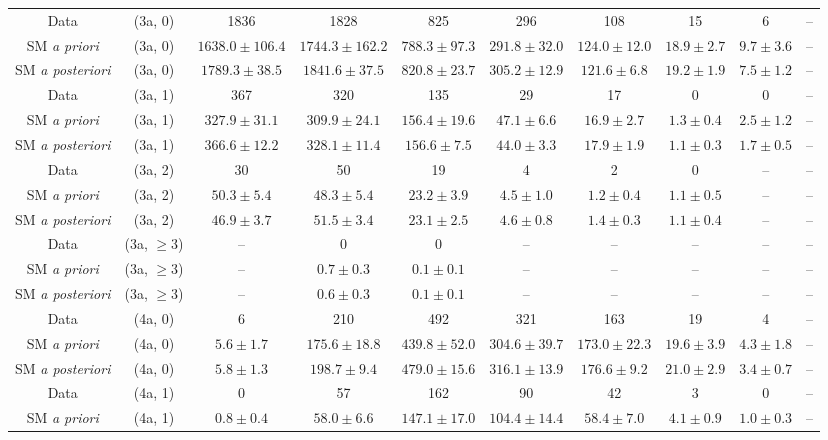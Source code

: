 \begin{table}[h!]
{\begin{tabular}{cccccccccc}
	Data & (3a, 0) & 1836 & 1828 & 825 & 296 & 108 & 15 & 6 & -- \\[0.5ex] 
	SM \textit{a priori} & (3a, 0) & $1638.0\pm 106.4$ & $1744.3\pm 162.2$ & $788.3\pm 97.3$ & $291.8\pm 32.0$ & $124.0\pm 12.0$ & $18.9\pm 2.7$ & $9.7\pm 3.6$ & -- \\[0.5ex] 
	SM \textit{a posteriori} & (3a, 0) & $1789.3\pm 38.5$ & $1841.6\pm 37.5$ & $820.8\pm 23.7$ & $305.2\pm 12.9$ & $121.6\pm 6.8$ & $19.2\pm 1.9$ & $7.5\pm 1.2$ & -- \\[0.5ex] 
	Data & (3a, 1) & 367 & 320 & 135 & 29 & 17 & 0 & 0 & -- \\[0.5ex] 
	SM \textit{a priori} & (3a, 1) & $327.9\pm 31.1$ & $309.9\pm 24.1$ & $156.4\pm 19.6$ & $47.1\pm 6.6$ & $16.9\pm 2.7$ & $1.3\pm 0.4$ & $2.5\pm 1.2$ & -- \\[0.5ex] 
	SM \textit{a posteriori} & (3a, 1) & $366.6\pm 12.2$ & $328.1\pm 11.4$ & $156.6\pm 7.5$ & $44.0\pm 3.3$ & $17.9\pm 1.9$ & $1.1\pm 0.3$ & $1.7\pm 0.5$ & -- \\[0.5ex] 
	Data & (3a, 2) & 30 & 50 & 19 & 4 & 2 & 0 & -- & -- \\[0.5ex] 
	SM \textit{a priori} & (3a, 2) & $50.3\pm 5.4$ & $48.3\pm 5.4$ & $23.2\pm 3.9$ & $4.5\pm 1.0$ & $1.2\pm 0.4$ & $1.1\pm 0.5$ & -- & -- \\[0.5ex] 
	SM \textit{a posteriori} & (3a, 2) & $46.9\pm 3.7$ & $51.5\pm 3.4$ & $23.1\pm 2.5$ & $4.6\pm 0.8$ & $1.4\pm 0.3$ & $1.1\pm 0.4$ & -- & -- \\[0.5ex] 
	Data & (3a, $\ge3$) & -- & 0 & 0 & -- & -- & -- & -- & -- \\[0.5ex] 
	SM \textit{a priori} & (3a, $\ge3$) & -- & $0.7\pm 0.3$ & $0.1\pm 0.1$ & -- & -- & -- & -- & -- \\[0.5ex] 
	SM \textit{a posteriori} & (3a, $\ge3$) & -- & $0.6\pm 0.3$ & $0.1\pm 0.1$ & -- & -- & -- & -- & -- \\[0.5ex] 
	Data & (4a, 0) & 6 & 210 & 492 & 321 & 163 & 19 & 4 & -- \\[0.5ex] 
	SM \textit{a priori} & (4a, 0) & $5.6\pm 1.7$ & $175.6\pm 18.8$ & $439.8\pm 52.0$ & $304.6\pm 39.7$ & $173.0\pm 22.3$ & $19.6\pm 3.9$ & $4.3\pm 1.8$ & -- \\[0.5ex] 
	SM \textit{a posteriori} & (4a, 0) & $5.8\pm 1.3$ & $198.7\pm 9.4$ & $479.0\pm 15.6$ & $316.1\pm 13.9$ & $176.6\pm 9.2$ & $21.0\pm 2.9$ & $3.4\pm 0.7$ & -- \\[0.5ex] 
	Data & (4a, 1) & 0 & 57 & 162 & 90 & 42 & 3 & 0 & -- \\[0.5ex] 
	SM \textit{a priori} & (4a, 1) & $0.8\pm 0.4$ & $58.0\pm 6.6$ & $147.1\pm 17.0$ & $104.4\pm 14.4$ & $58.4\pm 7.0$ & $4.1\pm 0.9$ & $1.0\pm 0.3$ & -- \\[0.5ex] 

\end{tabular}}
\end{table}
